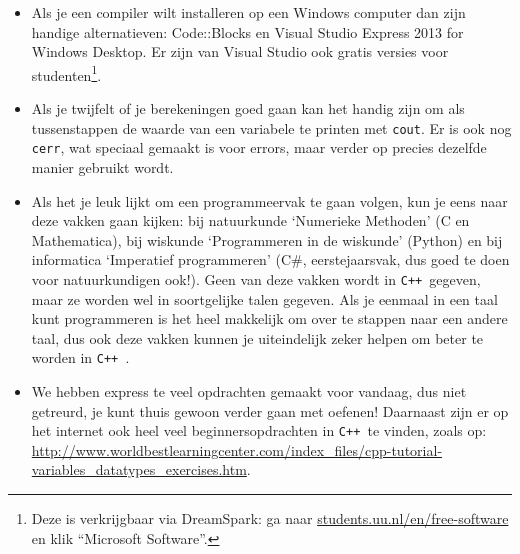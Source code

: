 \documentclass[12pt,a4paper]{article}
\newcommand{\icode}{\lstinline}
\newcommand{\mono}{\texttt}
\newcommand{\cpp}{\mono{C++ }}
\begin{document}
\begin{itemize}
\begin{enumerate}
	\end{enumerate}
	\item Als je een compiler wilt installeren op een Windows computer dan zijn handige alternatieven: Code::Blocks en Visual Studio Express 2013 for Windows Desktop. Er zijn van Visual Studio ook gratis versies voor studenten\footnote{Deze is verkrijgbaar via DreamSpark: ga naar \url{students.uu.nl/en/free-software} en klik ``Microsoft Software''.}.
	\item Als je twijfelt of je berekeningen goed gaan kan het handig zijn om als tussenstappen de waarde van een variabele te printen met \icode{cout}. Er is ook nog \icode{cerr}, wat speciaal gemaakt is voor errors, maar verder op precies dezelfde manier gebruikt wordt.
	\item Als het je leuk lijkt om een programmeervak te gaan volgen, kun je eens naar deze vakken gaan kijken: bij natuurkunde `Numerieke Methoden' (C en Mathematica), bij wiskunde `Programmeren in de wiskunde' (Python) en bij informatica `Imperatief programmeren' (C\#, eerstejaarsvak, dus goed te doen voor natuurkundigen ook!). Geen van deze vakken wordt in \cpp gegeven, maar ze worden wel in soortgelijke talen gegeven. Als je eenmaal in een taal kunt programmeren is het heel makkelijk om over te stappen naar een andere taal, dus ook deze vakken kunnen je uiteindelijk zeker helpen om beter te worden in \cpp. 
	\item We hebben express te veel opdrachten gemaakt voor vandaag, dus niet getreurd, je kunt thuis gewoon verder gaan met oefenen! Daarnaast zijn er op het internet ook heel veel beginnersopdrachten in \cpp te vinden, zoals op: \url{http://www.worldbestlearningcenter.com/index_files/cpp-tutorial-variables_datatypes_exercises.htm}.
\end{itemize}
\end{document}
